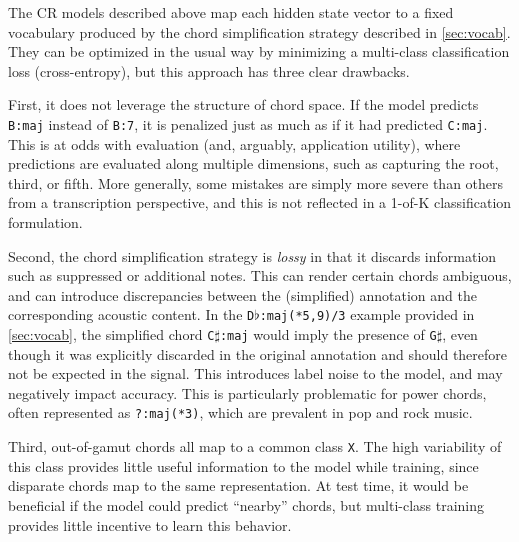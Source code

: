 \documentclass{article}
\begin{document}
The CR models described above map each hidden state vector to a fixed vocabulary produced by the chord simplification strategy described in \cref{sec:vocab}.
They can be optimized in the usual way by minimizing a multi-class classification loss (cross-entropy), but this approach has three clear drawbacks.

First, it does not leverage the structure of chord space.
If the model predicts \texttt{B:maj} instead of \texttt{B:7}, it is penalized just as much as if it had predicted \texttt{C:maj}.
This is at odds with evaluation (and, arguably, application utility), where predictions are evaluated along multiple dimensions, such as capturing the root, third, or fifth.
More generally, some mistakes are simply more severe than others from a transcription perspective, and this is not reflected in a 1-of-K classification formulation.



Second, the chord simplification strategy is \emph{lossy} in that it discards information such as suppressed or additional notes.
This can render certain chords ambiguous, and can introduce discrepancies between the (simplified) annotation and the corresponding acoustic content.
In the \texttt{D}$\flat$\texttt{:maj(*5,9)/3} example provided in \cref{sec:vocab}, the simplified chord \texttt{C}$\sharp$\texttt{:maj} would imply the presence of \texttt{G}$\sharp$, even though it was explicitly discarded in the original annotation and should therefore not be expected in the signal.
This introduces label noise to the model, and may negatively impact accuracy.
This is particularly problematic for power chords, often represented as \texttt{?:maj(*3)}, which are prevalent in pop and rock music.


Third, out-of-gamut chords all map to a common class \texttt{X}.
The high variability of this class provides little useful information to the model while training, since disparate chords map to the same representation.
At test time, it would be beneficial if the model could predict ``nearby'' chords, but multi-class training provides little incentive to learn this behavior.
\end{document}
